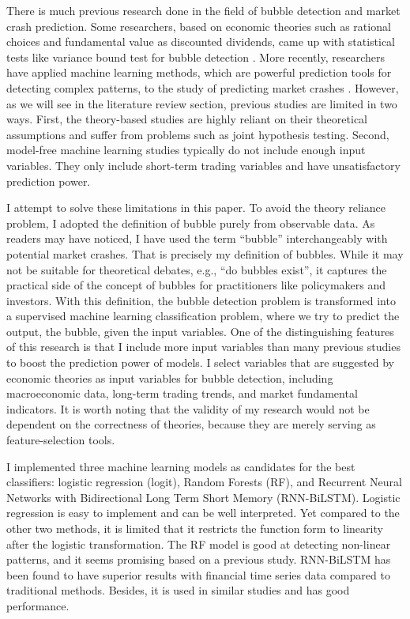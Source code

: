 \documentclass[12pt, man, a4paper, floatsintext]{apa7}
\begin{document}
There is much previous research done in the field of bubble detection and market crash prediction. Some researchers, based on economic theories such as rational choices and fundamental value as discounted dividends, came up with statistical tests like variance bound test for bubble detection \parencite{shiller1980}. More recently, researchers have applied machine learning methods, which are powerful prediction tools for detecting complex patterns, to the study of predicting market crashes \parencite{Chat2018}. However, as we will see in the literature review section, previous studies are limited in two ways. First, the theory-based studies are highly reliant on their theoretical assumptions and suffer from problems such as joint hypothesis testing. Second, model-free machine learning studies typically do not include enough input variables. They only include short-term trading variables and have unsatisfactory prediction power. 

I attempt to solve these limitations in this paper. To avoid the theory reliance problem, I adopted the definition of bubble purely from observable data. As readers may have noticed, I have used the term “bubble” interchangeably with potential market crashes. That is precisely my definition of bubbles. While it may not be suitable for theoretical debates, e.g., “do bubbles exist”, it captures the practical side of the concept of bubbles for practitioners like policymakers and investors. With this definition, the bubble detection problem is transformed into a supervised machine learning classification problem, where we try to predict the output, the bubble, given the input variables. One of the distinguishing features of this research is that I include more input variables than many previous studies to boost the prediction power of models. I select variables that are suggested by economic theories as input variables for bubble detection, including macroeconomic data, long-term trading trends, and market fundamental indicators. It is worth noting that the validity of my research would not be dependent on the correctness of theories, because they are merely serving as feature-selection tools.

I implemented three machine learning models as candidates for the best classifiers: logistic regression (logit), Random Forests (RF), and Recurrent Neural Networks with Bidirectional Long Term Short Memory (RNN-BiLSTM). Logistic regression is easy to implement and can be well interpreted. Yet compared to the other two methods, it is limited that it restricts the function form to linearity after the logistic transformation. The RF model is good at detecting non-linear patterns, and it seems promising based on a previous study. RNN-BiLSTM has been found to have superior results with financial time series data compared to traditional methods. Besides, it is used in similar studies and has good performance. 
\end{document}
